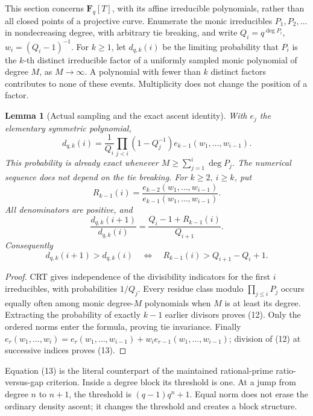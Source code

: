 \documentclass[11pt]{article}
\newtheorem{lemma}[theorem]{Lemma}
\newcommand{\F}{\mathbf F}
\begin{document}
This section concerns \(\F_q[T]\), with its affine irreducible polynomials,
rather than all closed points of a projective curve. Enumerate the monic
irreducibles \(P_1,P_2,\ldots\) in nondecreasing degree, with arbitrary
tie breaking, and write \(Q_i=q^{\deg P_i}\), \(w_i=(Q_i-1)^{-1}\).
For \(k\geq1\), let \(d_{q,k}(i)\) be the limiting probability that
\(P_i\) is the \(k\)-th distinct irreducible factor of a uniformly
sampled monic polynomial of degree \(M\), as \(M\to\infty\).
A polynomial with fewer than \(k\) distinct factors contributes to none
of these events. Multiplicity does not change the position of a factor.

\begin{lemma}[Actual sampling and the exact ascent identity]\label{lem:polyAscent}
With \(e_j\) the elementary symmetric polynomial,
\[
 d_{q,k}(i)=\frac1{Q_i}\prod_{j<i}(1-Q_j^{-1})
                  e_{k-1}(w_1,\ldots,w_{i-1}).       \tag{12}
\]
This probability is already exact whenever
\(M\geq\sum_{j=1}^i\deg P_j\). The numerical sequence does not depend
on the tie breaking. For \(k\geq2,\ i\geq k\), put
\[
 R_{k-1}(i)=
 \frac{e_{k-2}(w_1,\ldots,w_{i-1})}
      {e_{k-1}(w_1,\ldots,w_{i-1})}.
\]
All denominators are positive, and
\[
 \frac{d_{q,k}(i+1)}{d_{q,k}(i)}
   =\frac{Q_i-1+R_{k-1}(i)}{Q_{i+1}}.
\]
Consequently
\[
 d_{q,k}(i+1)>d_{q,k}(i)
 \quad\Longleftrightarrow\quad
 R_{k-1}(i)>Q_{i+1}-Q_i+1.                          \tag{13}\label{eq:polyStep}
\]
\end{lemma}
\begin{proof}
CRT gives independence of the divisibility indicators for the first
\(i\) irreducibles, with probabilities \(1/Q_j\). Every residue class
modulo \(\prod_{j\leq i}P_j\) occurs equally often among monic
degree-\(M\) polynomials when \(M\) is at least its degree. Extracting
the probability of exactly \(k-1\) earlier divisors proves (12).
Only the ordered norms enter the formula, proving tie invariance.
Finally \(e_r(w_1,\ldots,w_i)=e_r(w_1,\ldots,w_{i-1})
+w_i e_{r-1}(w_1,\ldots,w_{i-1})\); division of (12) at successive
indices proves (13).
\end{proof}

Equation (13) is the literal counterpart of the maintained rational-prime
ratio-versus-gap criterion. Inside a degree block its threshold is one.
At a jump from degree \(n\) to \(n+1\), the threshold is
\((q-1)q^n+1\). Equal norm does not erase the ordinary density ascent;
it changes the threshold and creates a block structure.
\end{document}
